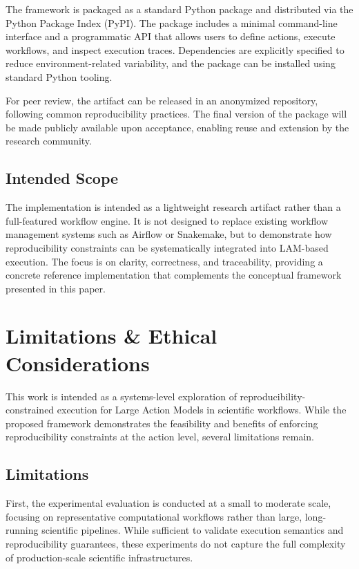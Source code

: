\documentclass[conference]{IEEEtran}
\begin{document}
The framework is packaged as a standard Python package and distributed via the Python Package Index (PyPI). The package includes a minimal command-line interface and a programmatic API that allows users to define actions, execute workflows, and inspect execution traces. Dependencies are explicitly specified to reduce environment-related variability, and the package can be installed using standard Python tooling.

For peer review, the artifact can be released in an anonymized repository, following common reproducibility practices. The final version of the package will be made publicly available upon acceptance, enabling reuse and extension by the research community.

\subsection{Intended Scope}

The implementation is intended as a lightweight research artifact rather than a full-featured workflow engine. It is not designed to replace existing workflow management systems such as Airflow or Snakemake, but to demonstrate how reproducibility constraints can be systematically integrated into LAM-based execution. The focus is on clarity, correctness, and traceability, providing a concrete reference implementation that complements the conceptual framework presented in this paper.

\section{Limitations \& Ethical Considerations}

This work is intended as a systems-level exploration of reproducibility-constrained execution for Large Action Models in scientific workflows. While the proposed framework demonstrates the feasibility and benefits of enforcing reproducibility constraints at the action level, several limitations remain.

\subsection{Limitations}

First, the experimental evaluation is conducted at a small to moderate scale, focusing on representative computational workflows rather than large, long-running scientific pipelines. While sufficient to validate execution semantics and reproducibility guarantees, these experiments do not capture the full complexity of production-scale scientific infrastructures.
\end{document}
